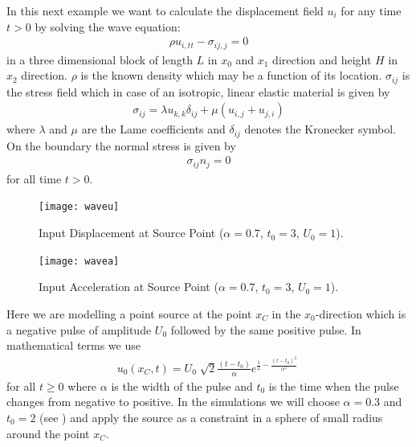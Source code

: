 

In this next example we want to calculate the displacement field $u_{i}$ for any time $t>0$ by solving the wave equation:
\begin{eqnarray}\label{WAVE general problem}
\rho u_{i,tt} - \sigma_{ij,j}=0
\end{eqnarray}
in a three dimensional block of length $L$ in $x_{0}$
and $x_{1}$ direction and height $H$ in $x_{2}$ direction.
$\rho$ is the known density which may be a function of its location.
$\sigma_{ij}$ is the stress field which in case of an
isotropic, linear elastic material is given by
\begin{eqnarray}\label{WAVE stress}
\sigma_{ij} = \lambda u_{k,k} \delta_{ij} + \mu (u_{i,j} + u_{j,i})
\end{eqnarray}
where $\lambda$ and $\mu$ are the Lame coefficients
and $\delta_{ij}$ denotes the Kronecker symbol.
On the boundary the normal stress is given by
\begin{eqnarray}\label{WAVE natural}
\sigma_{ij}n_{j}=0
\end{eqnarray}
for all time $t>0$.

\begin{figure}[t!]
\centerline{\texttt{[image: waveu]}}
\caption{Input Displacement at Source Point ($\alpha=0.7$, $t_{0}=3$, $U_{0}=1$).}
\label{WAVE FIG 1.2}
\end{figure}

\begin{figure}
\centerline{\texttt{[image: wavea]}}
\caption{Input Acceleration at Source Point ($\alpha=0.7$, $t_{0}=3$, $U_{0}=1$).}
\label{WAVE FIG 1.1}
\end{figure}

Here we are modelling a point source at the point $x_C$ in the
$x_{0}$-direction which is a negative pulse of amplitude
$U_{0}$ followed by the same positive pulse.
In mathematical terms we use
\begin{eqnarray} \label{WAVE source}
u_{0}(x_C,t)= U_{0} \; \sqrt{2}  \frac{(t-t_{0})}{\alpha} e^{\frac{1}{2}-\frac{(t-t_{0})^2}{\alpha^2}} \ 
\end{eqnarray}
for all $t\ge0$ where $\alpha$ is the width of the pulse and $t_{0}$
is the time when the pulse changes from negative to positive.
In the simulations we will choose $\alpha=0.3$ and $t_{0}=2$ (see
\fig{WAVE FIG 1.2}) and apply the source as a constraint in a sphere of small
radius around the point $x_C$.  

